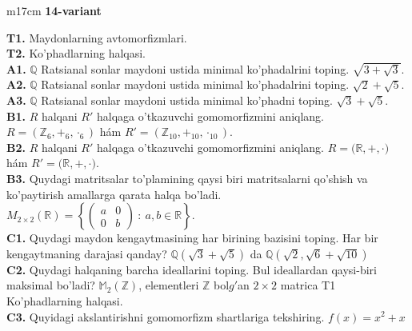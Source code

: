 \documentclass{article}
\begin{document}
\begin{tabular}{m{17cm}}
\textbf{14-variant}
\newline

\textbf{T1.} Maydonlarning avtomorfizmlari. \\
\textbf{T2.} Ko'phadlarning halqasi. \\
\textbf{A1.} \(\mathbb{Q}\) Ratsianal sonlar maydoni ustida minimal ko'phadalrini toping.
\(\sqrt{3 + \sqrt{3}}\). \\
\textbf{A2.} \(\mathbb{Q}\) Ratsianal sonlar maydoni ustida minimal ko'phadalrini toping.
\(\sqrt{2} + \sqrt{5}\). \\
\textbf{A3.} \(\mathbb{Q}\) Ratsianal sonlar maydoni ustida minimal ko'phadni toping.
\(\sqrt{3} + \sqrt{5}\). \\
\textbf{B1.} \(R\) halqani \(R'\) halqaga o'tkazuvchi gomomorfizmini aniqlang.
\(R = (\mathbb{Z}_{6}, +_{6}, \cdot_{6})\) hám \(R' = (\mathbb{Z}_{10}, +_{10}, \cdot_{10})\). \\
\textbf{B2.} \(R\) halqani \(R'\) halqaga o'tkazuvchi gomomorfizmini aniqlang.
\(R\mathbb{= (R,} + , \cdot )\) hám \(R'\mathbb{= (R,} + , \cdot )\). \\
\textbf{B3.} Quydagi matritsalar to'plamining qaysi biri matritsalarni qo'shish va ko'paytirish amallarga qarata halqa bo'ladi.
\(M_{2 \times 2}\mathbb{(R) =}\left\{ \begin{pmatrix}
a & 0 \\
0 & b
\end{pmatrix}\ :\ a,b \in \mathbb{R} \right\}\). \\
\textbf{C1.} Quydagi maydon kengaytmasining har birining bazisini toping. Har bir kengaytmaning darajasi qanday?
\(\mathbb{Q}\left( \sqrt{3} + \sqrt{5} \right)\) da \(\mathbb{Q}\left( \sqrt{2},\sqrt{6} + \sqrt{10} \right)\) \\
\textbf{C2.} Quydagi halqaning barcha ideallarini toping. Bul ideallardan qaysi-biri maksimal bo'ladi?
\(\mathbb{M}_{2}\left( \mathbb{Z} \right)\), elementleri \(\mathbb{Z}\) bol\(g'\)an \(2 \times 2\) matrica
T1 Ko'phadlarning halqasi. \\
\textbf{C3.} Quyidagi akslantirishni gomomorfizm shartlariga tekshiring. \(f(x) = x^{2} + x\) \\

\end{tabular}
\vspace{1cm}
\end{document}
